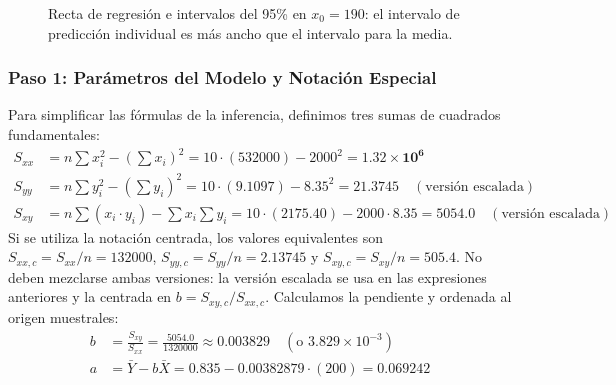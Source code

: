 \documentclass[11pt,a4paper]{article}
\begin{document}
    \begin{figure}[htbp]
        \centering
        \caption{Recta de regresión e intervalos del 95\% en $x_0=190$: el intervalo de predicción individual es más ancho que el intervalo para la media.}
        \label{fig:evaporacion}
    \end{figure}

    \subsubsection*{Paso 1: Parámetros del Modelo y Notación Especial}
    Para simplificar las fórmulas de la inferencia, definimos tres sumas de cuadrados fundamentales:
    \begin{align}
        S_{xx} &= n \sum x_i^2 - \left(\sum x_i\right)^2 = 10 \cdot (532000) - 2000^2 = \mathbf{1.32 \times 10^6} \\
        S_{yy} &= n \sum y_i^2 - \left(\sum y_i\right)^2 = 10 \cdot (9.1097) - 8.35^2 = \mathbf{21.3745} \quad (\text{versión escalada}) \\
        S_{xy} &= n \sum (x_i \cdot y_i) - \sum x_i \sum y_i = 10 \cdot (2175.40) - 2000 \cdot 8.35 = \mathbf{5054.0} \quad (\text{versión escalada})
    \end{align}
    Si se utiliza la notación centrada, los valores equivalentes son $S_{xx,c}=S_{xx}/n=132000$, $S_{yy,c}=S_{yy}/n=2.13745$ y $S_{xy,c}=S_{xy}/n=505.4$. No deben mezclarse ambas versiones: la versión escalada se usa en las expresiones anteriores y la centrada en $b=S_{xy,c}/S_{xx,c}$.
    Calculamos la pendiente y ordenada al origen muestrales:
    \begin{align*}
        b &= \frac{S_{xy}}{S_{xx}} = \frac{5054.0}{1320000} \approx \mathbf{0.003829} \quad (\text{o } 3.829 \times 10^{-3}) \\
        a &= \bar{Y} - b \bar{X} = 0.835 - 0.00382879 \cdot (200) = \mathbf{0.069242}
    \end{align*}
\end{document}
